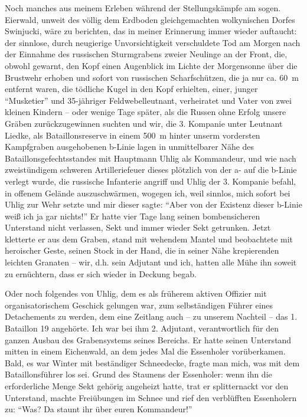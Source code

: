 Noch manches aus meinem Erleben während der Stellungskämpfe am sogen. Eierwald, unweit des völlig dem Erdboden gleichgemachten wolkynischen Dorfes Swinjucki, wäre zu berichten, das in meiner Erinnerung immer wieder auftaucht: der sinnlose, durch neugierige Unvorsichtigkeit verschuldete Tod am Morgen nach der Einnahme des russischen Sturmgrabens zweier Neulinge an der Front, die, obwohl gewarnt, den Kopf einen Augenblick im Lichte der Morgensonne über die Brustwehr erhoben und sofort von russischen Scharfschützen, die ja nur ca. 60~m entfernt waren, die tödliche Kugel in den Kopf erhielten, einer, junger \enquote{Musketier} und 35-jähriger Feldwebelleutnant, verheiratet und Vater von zwei kleinen Kindern -- oder wenige Tage später, als die Russen ohne Erfolg unsere Gräben zurückzugewinnen suchten und wir, die 3. Kompanie unter Leutnant Liedke, als Bataillonsreserve in einem 500~m hinter unserm vordersten Kampfgraben ausgehobenen b-Linie lagen in unmittelbarer Nähe des Bataillonsgefechtsstandes mit Hauptmann Uhlig als Kommandeur, und wie nach zweistündigem schweren Artilleriefeuer dieses plötzlich von der a- auf die b-Linie verlegt wurde, die russische Infanterie angriff und Uhlig der 3. Kompanie befahl, in offenem Gelände auszuschwärmen, wogegen ich, weil sinnlos, mich sofort bei Uhlig zur Wehr setzte und mir dieser sagte: \enquote{Aber von der Existenz dieser b-Linie weiß ich ja gar nichts!} Er hatte vier Tage lang seinen bombensicheren Unterstand nicht verlassen, Sekt und immer wieder Sekt getrunken. Jetzt kletterte er aus dem Graben, stand mit wehendem Mantel und beobachtete mit heroischer Geste, seinen Stock in der Hand, die in seiner Nähe krepierenden leichten Granaten -- wir, d.h. sein Adjutant und ich, hatten alle Mühe ihn soweit zu ernüchtern, dass er sich wieder in Deckung begab.

Oder noch folgendes von Uhlig, dem es als früherem aktiven Offizier mit organisatorischem Geschick gelungen war, zum selbständigen Führer eines Detachements zu werden, dem eine Zeitlang auch -- zu unserem Nachteil -- das 1. Bataillon 19 angehörte. Ich war bei ihm 2. Adjutant, verantwortlich für den ganzen Ausbau des Grabensystems seines Bereichs. Er hatte seinen Unterstand mitten in einem Eichenwald, an dem jedes Mal die Essenholer vorüberkamen. Bald, es war Winter mit beständiger Schneedecke, fragte man mich, was mit dem Bataillonsführer los sei. Grund des Staunens der Essenholer: wenn ihn die erforderliche Menge Sekt gehörig angeheizt hatte, trat er splitternackt vor den Unterstand, machte Freiübungen im Schnee und rief den verblüfften Essenholern zu: \enquote{Was? Da staunt ihr über euren Kommandeur!}

